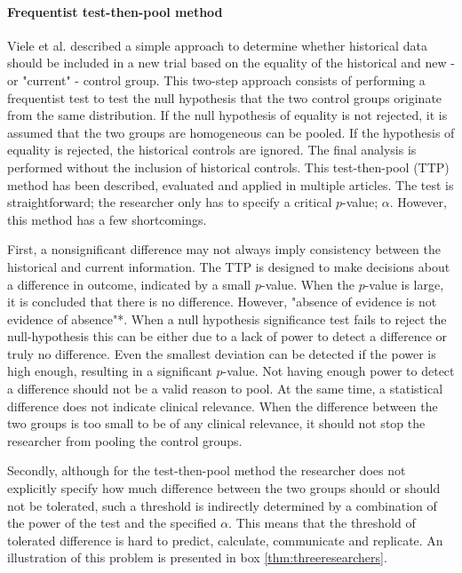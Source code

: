 \documentclass[Royal,sagev,times]{sagej}
\begin{document}

\paragraph{Frequentist test-then-pool method}
Viele et al. described a simple approach to determine whether historical data should be included in a new trial based on the equality of the historical and new - or "current" - control group. \cite{vRosmalen2018} This two-step approach consists of performing a frequentist test to test the null hypothesis that the two control groups originate from the same distribution.\cite{viele2014} If the null hypothesis of equality is not rejected, it is assumed that the two groups are homogeneous can be pooled. If the hypothesis of equality is rejected, the historical controls are ignored. \cite{viele2014} The final analysis is performed without the inclusion of historical controls. This test-then-pool (TTP) method has been described, evaluated and applied in multiple articles. The test is straightforward; the researcher only has to specify a critical $p$-value; $\alpha$. However, this method has a few shortcomings.

First, a nonsignificant difference may not always imply consistency between the historical and current information.\cite{li2020} The TTP is designed to make decisions about a difference in outcome, indicated by a small $p$-value.\cite{Silva2009} When the $p$-value is large, it is concluded that there is no difference. However, "absence of evidence is not evidence of absence"*\cite{altman1995}. When a null hypothesis significance test fails to reject the null-hypothesis this can be either due to a lack of power to detect a difference or truly no difference.\cite{Silva2009} Even the smallest deviation can be detected if the power is high enough, resulting in a significant $p$-value. Not having enough power to detect a difference should not be a valid reason to pool. At the same time, a statistical difference does not indicate clinical relevance.\cite{kruschke2018} When the difference between the two groups is too small to be of any clinical relevance, it should not stop the researcher from pooling the control groups.

Secondly, although for the test-then-pool method the researcher does not explicitly specify how much difference between the two groups should or should not be tolerated, such a threshold is indirectly determined by a combination of the power of the test and the specified $\alpha$. This means that the threshold of tolerated difference is hard to predict, calculate, communicate and replicate.\cite{kruschke2018} An illustration of this problem is presented in box \ref{thm:threeresearchers}.
\end{document}
